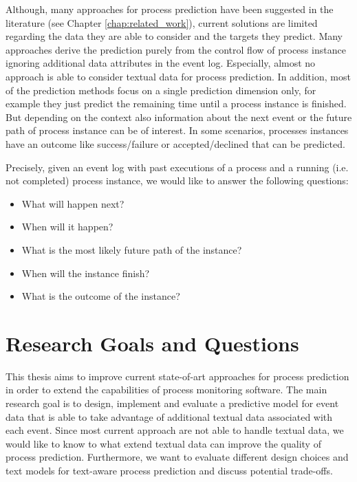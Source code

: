 Although, many approaches for process prediction have been suggested in the literature (see Chapter \ref{chap:related_work}), current solutions are limited regarding the data they are able to consider and the targets they predict.
Many approaches derive the prediction purely from the control flow of process instance ignoring additional data attributes in the event log.
Especially, almost no approach is able to consider textual data for process prediction.
In addition, most of the prediction methods focus on a single prediction dimension only, for example they just predict the remaining time until a process instance is finished.
But depending on the context also information about the next event or the future path of process instance can be of interest.
In some scenarios, processes instances have an outcome like success/failure or accepted/declined that can be predicted.

Precisely, given an event log with past executions of a process and a running (i.e. not completed) process instance, we would like to answer the following questions:

\begin{itemize}
	\item What will happen next?
	\item When will it happen?
	\item What is the most likely future path of the instance?
	\item When will the instance finish?
	\item What is the outcome of the instance?
\end{itemize}



\section{Research Goals and Questions}

This thesis aims to improve current state-of-art approaches for process prediction in order to extend the capabilities of process monitoring software.
The main research goal is to design, implement and evaluate a predictive model for event data that is able to take advantage of additional textual data associated with each event.
Since most current approach are not able to handle textual data, we would like to know to what extend textual data can improve the quality of process prediction.
Furthermore, we want to evaluate different design choices and text models for text-aware process prediction and discuss potential trade-offs.

